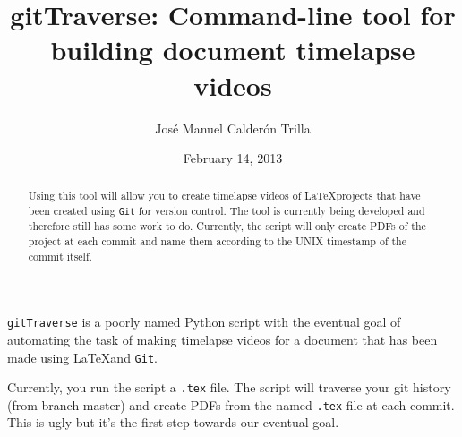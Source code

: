 \documentclass{article}
\title{gitTraverse: Command-line tool for building document timelapse videos}
\author{Jos\'{e} Manuel Calder\'{o}n Trilla}
\date{February 14, 2013}
\begin{document}
\maketitle

\begin{abstract}
Using this tool will allow you to create timelapse videos of \LaTeX projects
that have been created using \verb=Git= for version control. The tool is
currently being developed and therefore still has some work to do. Currently,
the script will only create PDFs of the project at each commit and name them
according to the UNIX timestamp of the commit itself. 
\end{abstract}

\verb=gitTraverse= is a poorly named Python script with the eventual goal of automating
the task of making timelapse videos for a document that has been made using \LaTeX and
\verb=Git=.

Currently, you run the script a \verb=.tex= file. The script will traverse your git 
history (from branch master) and create PDFs from the named \verb=.tex= file at
each commit. This is ugly but it's the first step towards our eventual goal.
\end{document}
